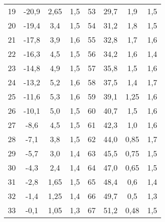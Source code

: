 \begin{table}[H]
\begin{tabular}{c c c c c c c c}
    19  &-20,9   &2,65   &1,5  &  53  &29,7    &1,9    &1,5 \\    
    20  &-19,4   &3,4    &1,5  &  54  &31,2    &1,8    &1,5 \\
    21  &-17,8   &3,9    &1,6  &  55  &32,8    &1,7    &1,6 \\
    22  &-16,3   &4,5    &1,5  &  56  &34,2    &1,6    &1,4 \\
    23  &-14,8   &4,9    &1,5  &  57  &35,8    &1,5    &1,6 \\
    24  &-13,2   &5,2    &1,6  &  58  &37,5    &1,4    &1,7 \\
    25  &-11,6   &5,3    &1,6  &  59  &39,1    &1,25   &1,6 \\
    26  &-10,1   &5,0    &1,5  &  60  &40,7    &1,5    &1,6 \\
    27  &-8,6    &4,5    &1,5  &  61  &42,3    &1,0    &1,6 \\
    28  &-7,1    &3,8    &1,5  &  62  &44,0    &0,85   &1,7 \\
    29  &-5,7    &3,0    &1,4  &  63  &45,5    &0,75   &1,5 \\
    30  &-4,3    &2,4    &1,4  &  64  &47,0    &0,65   &1,5 \\
    31  &-2,8    &1,65   &1,5  &  65  &48,4    &0,6    &1,4 \\
    32  &-1,4    &1,25   &1,4  &  66  &49,7    &0,5    &1,3 \\
    33  &-0,1    &1,05   &1,3  &  67  &51,2    &0,48   &1,5 \\
    \bottomrule
    \end{tabular}
    \end{table}


